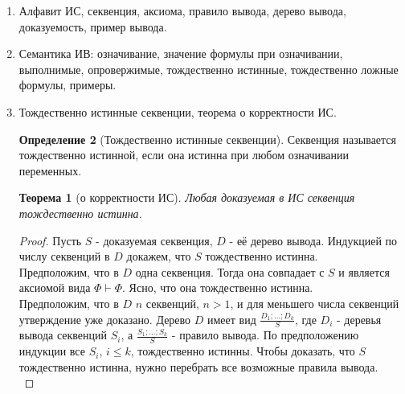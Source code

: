 \documentclass[a4paper]{article}
\newtheorem*{theorem*}{Теорема}
\theoremstyle{definition}
\newtheorem*{definition*}{Определение}
\begin{document}
\begin{enumerate}
       \begin{definition*}[Возвратная индукция]
        Пусть для каждого $n$ из того, что $\Delta(k)$ истинно при любом $k < n$, следует, что истинно $\Delta(n)$. Тогда $\Delta(n)$ истинн для всех $n$.
       \end{definition*}

       \begin{proof}
        Оба принципа индукции легко вытекают из следующего факта: в любом непустом множестве натуральных числе есть минимальный элемент. Покажем, как отсюда выводится возвратная индукция. \\
        Допустим, что $\Delta(n)$ ложно при некотором $n$. Рассмотрим множество $A = \{n | \Delta(n) \text{ ложно} \}$. Оно не пусто, следовательно, в нём есть минимальный элемент $n_0$. Тогда $\Delta(n_0)$ ложно, а если $n < n_0$, то $n \notin A$ и $\Delta(n)$ истинно. Получаем, что $\Delta(n_0)$ тоже истинно, противоречие.
       \end{proof}
 \item Алфавит ИС, секвенция, аксиома, правило вывода, дерево вывода, доказуемость, пример вывода.
 \item Семантика ИВ: означивание, значение формулы при означивании, выполнимые, опровержимые,
       тождественно истинные, тождественно ложные формулы, примеры.
 \item Тождественно истинные секвенции, теорема о корректности ИС.
       \begin{definition*}[Тождественно истинные секвенции]
        Секвенция называется тождественно истинной, если она истинна при любом означивании переменных.
       \end{definition*}
       \begin{theorem*}[о корректности ИС]
        Любая доказуемая в ИС секвенция тождественно истинна.
       \end{theorem*}
       \begin{proof}
        Пусть $S$ - доказуемая секвенция, $D$ - её дерево вывода. Индукцией по числу секвенций в $D$ докажем, что $S$ тождественно истинна.\\
        Предположим, что в $D$ одна секвенция. Тогда она совпадает с $S$ и является аксиомой вида $\Phi \vdash \Phi$. Ясно, что она тождественно истинна.\\
        Предположим, что в $D$ $n$ секвенций, $n > 1$, и для меньшего числа секвенций утверждение уже доказано. Дерево $D$ имеет вид $\frac{D_1;...;D_k}{S}$, где $D_i$ - деревья вывода секвенций $S_i$, а $\frac{S_1;...; S_k}{S}$ - правило вывода. По предположению индукции все $S_i$, $i \leq k$, тождественно истинны. Чтобы доказать, что $S$ тождественно истинна, нужно перебрать все возможные правила вывода.\\

\end{proof}
\end{enumerate}
\end{document}
